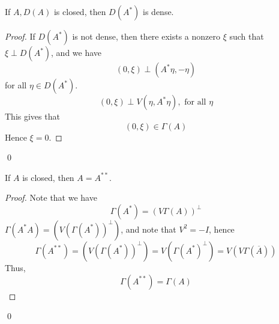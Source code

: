\begin{proposition}
    If $A, D(A)$ is closed, then $D(A^*)$ is dense.
\end{proposition}
\begin{proof}
    If $D(A^*)$ is not dense, then there exists a nonzero $\xi$ such that $\xi\perp D(A^*)$, and we have
    \begin{equation*}
        (0,\xi)\perp (A^*\eta, -\eta)
    \end{equation*}
    for all $\eta\in D(A^*)$. 
    \begin{equation*}
        (0,\xi)\perp V(\eta, A^*\eta), \text{ for all } \eta
    \end{equation*}
    This gives that
    \begin{equation*}
        (0,\xi)\in\Gamma(A)
    \end{equation*}
    Hence $\xi=0$.
\end{proof}
\qed

\begin{proposition}
    If $A$ is closed, then $A=A^{**}$.
\end{proposition}
\begin{proof}
    Note that we have
    \begin{equation*}
        \Gamma(A^*)=(V\Gamma(A))^\perp
    \end{equation*}
    $\Gamma(A^*A)=(V(\Gamma(A^*))^\perp)$, and note that $V^2=-I$, hence
    \begin{equation*}
        \Gamma(A^{**})=(V(\Gamma(A^*))^\perp)=V(\Gamma(A^*)^\perp)=V(V\Gamma(\overline{A}))
    \end{equation*}
    Thus,
    \begin{equation*}
        \Gamma(A^{**})=\Gamma(A)
    \end{equation*}
\end{proof}
\qed


